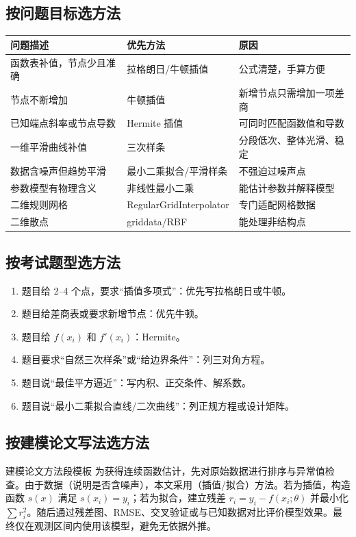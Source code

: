 \documentclass[11pt,a4paper]{ctexart}
\begin{document}
\subsection{按问题目标选方法}

\begin{longtable}{p{4.2cm}p{4.8cm}p{5.2cm}}
\toprule
问题描述 & 优先方法 & 原因 \\
\midrule
函数表补值，节点少且准确 & 拉格朗日/牛顿插值 & 公式清楚，手算方便 \\
节点不断增加 & 牛顿插值 & 新增节点只需增加一项差商 \\
已知端点斜率或节点导数 & Hermite 插值 & 可同时匹配函数值和导数 \\
一维平滑曲线补值 & 三次样条 & 分段低次、整体光滑、稳定 \\
数据含噪声但趋势平滑 & 最小二乘拟合/平滑样条 & 不强迫过噪声点 \\
参数模型有物理含义 & 非线性最小二乘 & 能估计参数并解释模型 \\
二维规则网格 & RegularGridInterpolator & 专门适配网格数据 \\
二维散点 & griddata/RBF & 能处理非结构点 \\
\bottomrule
\end{longtable}

\subsection{按考试题型选方法}

\begin{enumerate}[label=\arabic*)]
  \item 题目给 2--4 个点，要求“插值多项式”：优先写拉格朗日或牛顿。
  \item 题目给差商表或要求新增节点：优先牛顿。
  \item 题目给 $f(x_i)$ 和 $f'(x_i)$：Hermite。
  \item 题目要求“自然三次样条”或“给边界条件”：列三对角方程。
  \item 题目说“最佳平方逼近”：写内积、正交条件、解系数。
  \item 题目说“最小二乘拟合直线/二次曲线”：列正规方程或设计矩阵。
\end{enumerate}

\subsection{按建模论文写法选方法}

\begin{stepbox}{建模论文方法段模板}
为获得连续函数估计，先对原始数据进行排序与异常值检查。由于数据（说明是否含噪声），本文采用（插值/拟合）方法。若为插值，构造函数 $s(x)$ 满足 $s(x_i)=y_i$；若为拟合，建立残差 $r_i=y_i-f(x_i;\theta)$ 并最小化 $\sum r_i^2$。随后通过残差图、RMSE、交叉验证或与已知数据对比评价模型效果。最终仅在观测区间内使用该模型，避免无依据外推。
\end{stepbox}
\end{document}
